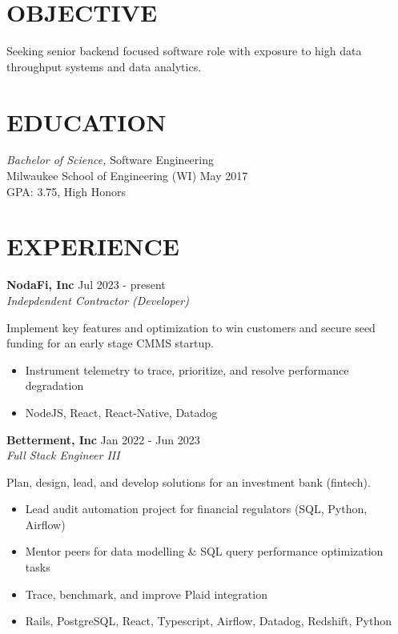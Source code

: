 \documentclass[line,margin]{res}
\begin{document}

\address{austin.dev@protonmail.com | (414) 334-4061}

\begin{resume}

\section{OBJECTIVE}
Seeking senior backend focused software role with exposure to high data throughput systems and data analytics.

\section{EDUCATION}
{\sl Bachelor of Science,} Software Engineering \\
Milwaukee School of Engineering (WI) \hfill May 2017 \\
GPA: 3.75, High Honors \\

\section{EXPERIENCE}

\textbf{NodaFi, Inc} \hfill Jul 2023 - present \\
{\sl Indepdendent Contractor (Developer)}

Implement key features and optimization to win customers and secure seed funding for an early stage CMMS startup.

\begin{itemize}
\item Instrument telemetry to trace, prioritize, and resolve performance degradation
\item NodeJS, React, React-Native, Datadog
\end{itemize}

\textbf{Betterment, Inc} \hfill Jan 2022 - Jun 2023 \\
{\sl Full Stack Engineer III}

Plan, design, lead, and develop solutions for an investment bank (fintech).

\begin{itemize}
\item Lead audit automation project for financial regulators (SQL, Python, Airflow)
\item Mentor peers for data modelling \& SQL query performance optimization tasks
\item Trace, benchmark, and improve Plaid integration
\item Rails, PostgreSQL, React, Typescript, Airflow, Datadog, Redshift, Python
\end{itemize}


\end{resume}
\end{document}
